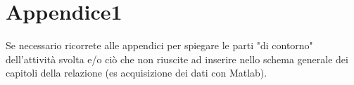 \documentclass[11pt]{report}
\begin{document}


\appendix
\chapter{Appendice1}
Se necessario ricorrete alle appendici per spiegare le parti "di contorno" dell'attività svolta e/o ciò che non riuscite ad inserire nello schema generale dei capitoli della relazione (es acquisizione dei dati con Matlab).



 
\end{document}
